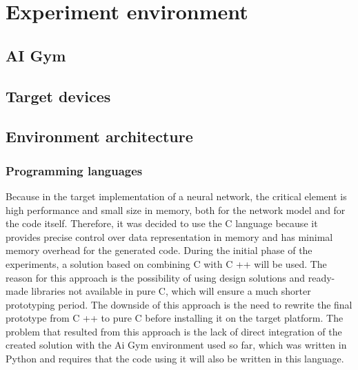 \FloatBarrier
\chapter{Experiment environment}

\FloatBarrier
\section{AI Gym}

\FloatBarrier
\section{Target devices}

\FloatBarrier
\section{Environment architecture}

\FloatBarrier
\subsection{Programming languages}
Because in the target implementation of a neural network, the critical element is high 
performance and small size in memory, both for the network model and for the code itself.
Therefore, it was decided to use the C language because it provides precise control over data 
representation in memory and has minimal memory overhead for the generated code. 
During the initial phase of the experiments, a solution based on combining C with C ++ will be
used. 
The reason for this approach is the possibility of using design solutions and ready-made
libraries not available in pure C, which will ensure a much shorter prototyping period. 
The downside of this approach is the need to rewrite the final prototype from C ++ to pure C 
before installing it on the target platform.
The problem that resulted from this approach is the lack of direct integration of the created
solution with the Ai Gym environment used so far, which was written in Python and requires that 
the code using it will also be written in this language.

